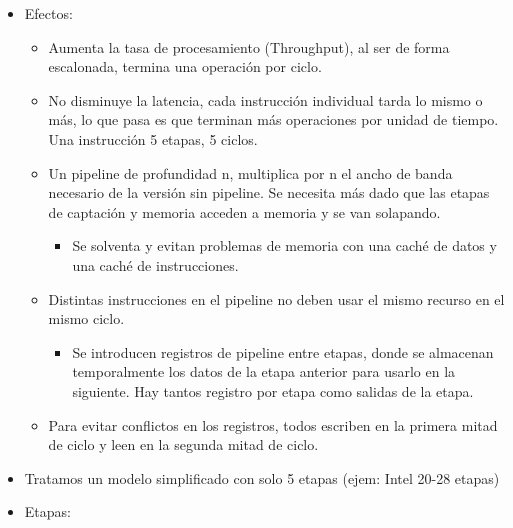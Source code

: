 \documentclass[12pt, twoside, openright]{report} %
\begin{document}
\begin{itemize}

	\item Efectos:

	      \begin{itemize}

		      \item Aumenta la tasa de procesamiento (Throughput), al ser de forma
		            escalonada, termina una operación por ciclo.
		      \item No disminuye la latencia, cada instrucción individual tarda lo
		            mismo o más, lo que pasa es que terminan más operaciones por
		            unidad de tiempo. Una instrucción 5 etapas, 5 ciclos.
		      \item Un pipeline de profundidad n, multiplica por n el ancho de banda
		            necesario de la versión sin pipeline. Se necesita más dado que las
		            etapas de captación y memoria acceden a memoria y se van
		            solapando.

		            \begin{itemize}

			            \item Se solventa y evitan problemas de memoria con una caché de datos
			                  y una caché de instrucciones.
		            \end{itemize}
		      \item Distintas instrucciones en el pipeline no deben usar el mismo
		            recurso en el mismo ciclo.

		            \begin{itemize}

			            \item Se introducen registros de pipeline entre etapas, donde se
			                  almacenan temporalmente los datos de la etapa anterior para
			                  usarlo en la siguiente. Hay tantos registro por etapa como
			                  salidas de la etapa.
		            \end{itemize}
		      \item Para evitar conflictos en los registros, todos escriben en la
		            primera mitad de ciclo y leen en la segunda mitad de ciclo.
	      \end{itemize}
	\item Tratamos un modelo simplificado con solo 5 etapas (ejem: Intel 20-28
	      etapas)
	      \pagebreak
	\item Etapas:
	      \begin{figure}[H]
		      {\def\svgwidth{1.1\textwidth}
			      }
	      \end{figure}
	      \begin{itemize}


\end{itemize}
\end{itemize}
\end{document}
